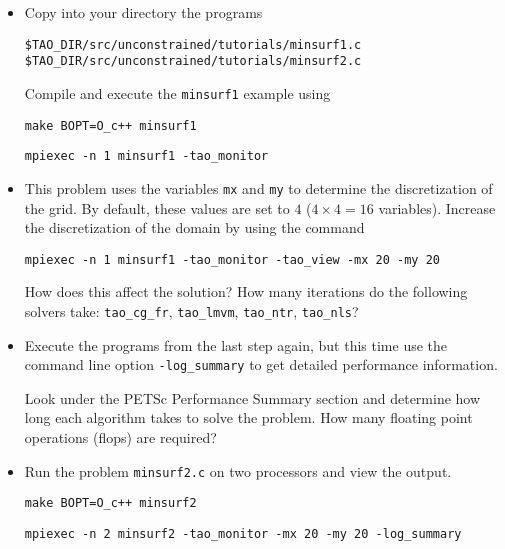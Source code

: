 \documentclass[11pt]{article}
\begin{document}
\begin{enumerate}
\begin{itemize}

\item
Copy into your directory the programs
\begin{alltt}
\$TAO_DIR/src/unconstrained/tutorials/minsurf1.c
\$TAO_DIR/src/unconstrained/tutorials/minsurf2.c

\end{alltt}
    
Compile and execute the \texttt{minsurf1} example using
    
\quad \texttt{make BOPT=O\_c++ minsurf1}

\quad \texttt{mpiexec -n 1 minsurf1 -tao\_monitor}

\item
This problem uses the variables {\tt mx} and {\tt my} to determine
the discretization of the grid.  By default, these values are set to
$4$ ($4 \times 4 = 16$ variables). Increase the discretization of the 
domain by using the command 

\quad \texttt{mpiexec -n 1 minsurf1 -tao\_monitor -tao\_view -mx 20 -my 20}

How does this affect the solution?
How many iterations do the following solvers take: \texttt{tao\_cg\_fr},
\texttt{tao\_lmvm}, \texttt{tao\_ntr}, \texttt{tao\_nls}?

\item
Execute the programs from the last step again, but this time use the command line option 
\texttt{-log\_summary} to get detailed performance information.

Look under the PETSc Performance Summary section and determine how long
each algorithm takes to solve the problem. How many floating point operations (flops) are required? 


\item
Run the problem \texttt{minsurf2.c} on two processors and view the output.

\quad \texttt{make BOPT=O\_c++ minsurf2}

\quad \texttt{mpiexec -n 2 minsurf2 -tao\_monitor -mx 20 -my 20 -log\_summary}

\end{itemize}

\end{enumerate}
\end{document}
